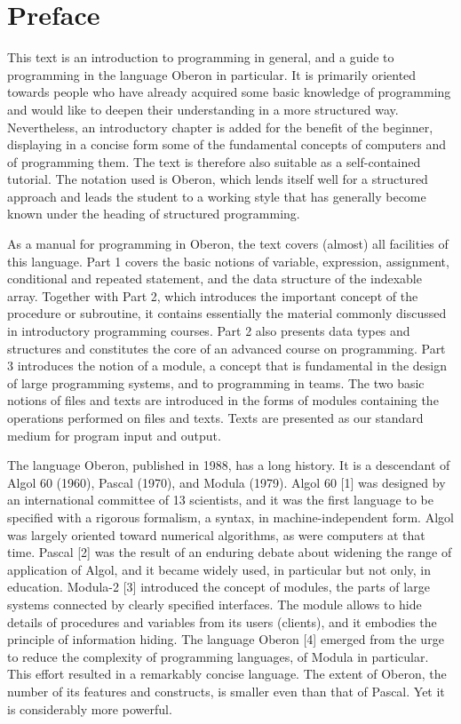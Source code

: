 \setcounter{chapter}{-1}
\chapter{Preface}

This text is an introduction to programming in general, and a guide to programming in the language
Oberon in particular. It is primarily oriented towards people who have already acquired some basic
knowledge of programming and would like to deepen their understanding in a more structured way.
Nevertheless, an introductory chapter is added for the benefit of the beginner, displaying in a
concise form some of the fundamental concepts of computers and of programming them. The text
is therefore also suitable as a self-contained tutorial. The notation used is Oberon, which lends itself
well for a structured approach and leads the student to a working style that has generally become
known under the heading of structured programming.

As a manual for programming in Oberon, the text covers (almost) all facilities of this language. Part
1 covers the basic notions of variable, expression, assignment, conditional and repeated statement,
and the data structure of the indexable array. Together with Part 2, which introduces the important
concept of the procedure or subroutine, it contains essentially the material commonly discussed in
introductory programming courses. Part 2 also presents data types and structures and constitutes
the core of an advanced course on programming. Part 3 introduces the notion of a module, a
concept that is fundamental in the design of large programming systems, and to programming in
teams. The two basic notions of files and texts are introduced in the forms of modules containing
the operations performed on files and texts. Texts are presented as our standard medium for
program input and output.

The language Oberon, published in 1988, has a long history. It is a descendant of Algol 60 (1960),
Pascal (1970), and Modula (1979). Algol 60 [1] was designed by an international committee of 13
scientists, and it was the first language to be specified with a rigorous formalism, a syntax, in
machine-independent form. Algol was largely oriented toward numerical algorithms, as were
computers at that time. Pascal [2] was the result of an enduring debate about widening the range of
application of Algol, and it became widely used, in particular but not only, in education. Modula-2 [3]
introduced the concept of modules, the parts of large systems connected by clearly specified
interfaces. The module allows to hide details of procedures and variables from its users (clients),
and it embodies the principle of information hiding. The language Oberon [4] emerged from the
urge to reduce the complexity of programming languages, of Modula in particular. This effort
resulted in a remarkably concise language. The extent of Oberon, the number of its features and
constructs, is smaller even than that of Pascal. Yet it is considerably more powerful.

